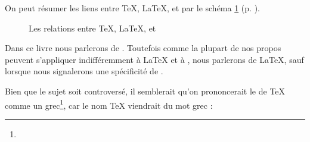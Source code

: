 On peut résumer les liens entre \TeX{}, \LaTeX{}, \XeTeX{} et \XeLaTeX{} par le schéma \ref{sch:tex} (p. \pageref{sch:tex}).

\begin{figure}[ht]
\centering

\caption{Les relations entre \TeX{}, \LaTeX{}, \XeTeX{} et \XeLaTeX{}}\label{sch:tex}
\end{figure} 

Dans  ce livre nous parlerons de \XeLaTeX{}. Toutefois comme la plupart de nos propos peuvent s'appliquer indifféremment  à \LaTeX{} et à \XeLaTeX{}, nous parlerons de \LaTeX{}, sauf lorsque nous signalerons une spécificité de \XeLaTeX{}.

\begin{anedocte}
Bien que le sujet soit controversé, il semblerait qu'on prononcerait le   de \TeX{} comme un  grec\footnote{}, car le nom \TeX{} viendrait du mot grec  : 
\end{anedocte}